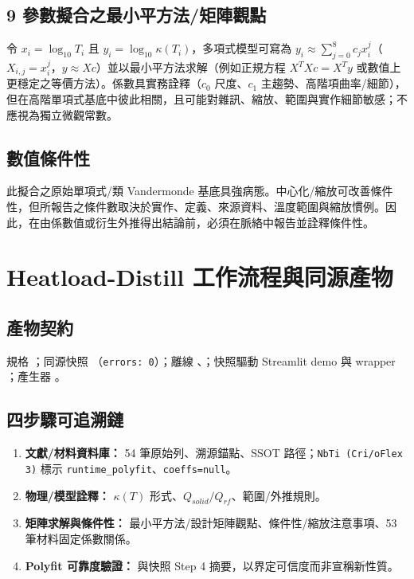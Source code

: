 \documentclass[11pt,a4paper]{article}
\begin{document}
\subsection{9 參數擬合之最小平方法/矩陣觀點}
令 $x_i=\log_{10}T_i$ 且 $y_i=\log_{10}\kappa(T_i)$，多項式模型可寫為 $y_i \approx \sum_{j=0}^{8} c_j x_i^j$（$X_{i,j}=x_i^j$，$y\approx Xc$）並以最小平方法求解（例如正規方程 $X^T X c = X^T y$ 或數值上更穩定之等價方法）。係數具實務詮釋（$c_0$ 尺度、$c_1$ 主趨勢、高階項曲率/細節），但在高階單項式基底中彼此相關，且可能對雜訊、縮放、範圍與實作細節敏感；不應視為獨立微觀常數。

\subsection{數值條件性}
此擬合之原始單項式/類 Vandermonde 基底具強病態。中心化/縮放可改善條件性，但所報告之條件數取決於實作、定義、來源資料、溫度範圍與縮放慣例。因此，在由係數值或衍生外推得出結論前，必須在脈絡中報告並詮釋條件性。

\section{Heatload-Distill 工作流程與同源產物}
\subsection{產物契約}
規格 ；同源快照 （\texttt{errors: 0}）；離線 、；快照驅動 Streamlit demo  與 wrapper ；產生器 。

\subsection{四步驟可追溯鏈}
\begin{enumerate}[leftmargin=*]
\item \textbf{文獻/材料資料庫：} 54 筆原始列、溯源錨點、SSOT 路徑；\texttt{NbTi (Cri/oFlex 3)} 標示 \texttt{runtime\_polyfit}、\texttt{coeffs=null}。
\item \textbf{物理/模型詮釋：} $\kappa(T)$ 形式、$Q_{solid}/Q_{rf}$、範圍/外推規則。
\item \textbf{矩陣求解與條件性：} 最小平方法/設計矩陣觀點、條件性/縮放注意事項、53 筆材料固定係數關係。
\item \textbf{Polyfit 可靠度驗證：}  與快照 Step 4 摘要，以界定可信度而非宣稱新性質。
\end{enumerate}
\end{document}
